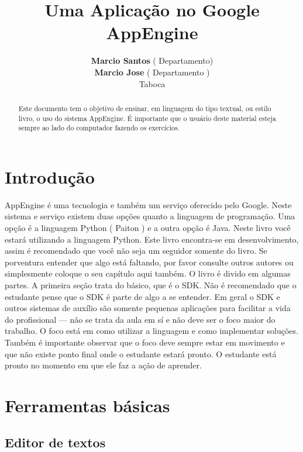 \documentclass[a4paper]{article}
\title{Uma Aplicação no Google AppEngine}
\author{\textbf{Marcio Santos} ( Departamento)\\
        \textbf{Marcio Jose} ( Departamento )\\
        Taboca}
\begin{document}
\maketitle
\begin{abstract}
Este documento tem o objetivo de ensinar, em linguagem do tipo textual, ou estilo livro, o uso do sistema AppEngine. É importante que o usuário deste material esteja sempre ao lado do computador fazendo os exercícios. 
\end{abstract}
\tableofcontents



\section{Introdu\c{c}\~{a}o}

AppEngine é uma tecnologia e também um serviço oferecido pelo Google. Neste sistema e serviço existem duas opções quanto a linguagem de programação. Uma opção é a linguagem Python ( Paiton ) e a outra opção é Java. Neste livro você estará utilizando a linguagem Python. Este livro encontra-se em desenvolvimento, assim é recomendado que você não seja um seguidor somente do livro. Se porventura entender que algo está faltando, por favor consulte outros autores ou simplesmente coloque o seu capítulo aqui também. O livro é divido em algumas partes. A primeira seção trata do básico, que é o SDK. Não é recomendado que o estudante pense que o SDK é parte de algo a se entender. Em geral o SDK e outros sistemas de auxílio são somente pequenas aplicações para facilitar a vida do profissional --- não se trata da aula em sí e não deve ser o foco maior do trabalho. O foco está em como utilizar a linguagem e como implementar soluções. Também é importante observar que o foco deve sempre estar em movimento e que não existe ponto final onde o estudante estará  pronto. O estudante está pronto no momento em  que ele faz a ação de aprender.



\section{Ferramentas básicas}

\subsection{Editor de textos}
\end{document}
